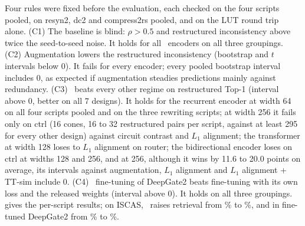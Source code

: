 Four rules were fixed before the evaluation, each checked on the four scripts pooled, on resyn2, dc2 and compress2rs
pooled, and on the LUT round trip alone. (C1) The baseline is blind: $\rho>0.5$ and restructured inconsistency above twice
the seed-to-seed noise. It holds for all \AbcNArch\ encoders on all three groupings. (C2) Augmentation lowers the
restructured inconsistency (bootstrap and $t$ intervals below 0). It fails for every encoder; every pooled bootstrap
interval includes 0, as expected if augmentation steadies predictions mainly against redundancy. (C3) \ours\ beats every
other regime on restructured Top-1 (interval above 0, better on all 7 designs). It holds for the recurrent encoder at
width 64 on all four scripts pooled and on the three rewriting scripts; at width 256 it fails only on ctrl (16 cones,
16 to 32 restructured pairs per script, against at least 295 for every other design) against circuit contrast and $L_1$
alignment; the transformer at width 128 loses to $L_1$ alignment on router; the bidirectional encoder loses on ctrl at widths
128 and 256, and at 256, although it wins by 11.6 to 20.0 points on average, its intervals against augmentation, $L_1$
alignment and $L_1$ alignment + TT-sim include 0. (C4) \ours\ fine-tuning of DeepGate2 beats fine-tuning with its own loss and the released weights
(interval above 0). It holds on all three groupings.  gives the per-script results; on ISCAS, \ours\
raises retrieval from \AbcIsBaseTop\% to \AbcIsOursTop\%, and in fine-tuned DeepGate2 from \AbcIsFtCtrlTop\% to \AbcIsFtEqTop\%.

\begin{table}[h]
\centering\scriptsize
\caption{Certified ABC rewrites of the EPFL test circuits: restructured Top-1 (\%) and $\rho$ per script (recurrent encoder,
width 64, 5 seeds; DeepGate2 fine-tuned for 5 epochs, 5 seeds). Under our synthesis (S1 to S4) the same models reach
\AbcBaseTopSyn\% (baseline) and \AbcOursTopSyn\% (\ours).}
\label{tab:app_abc}
\resizebox{\columnwidth}{!}{}
\end{table}

